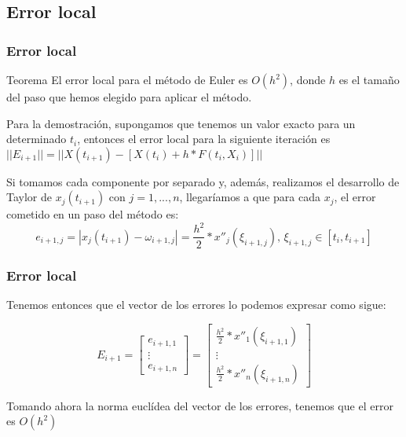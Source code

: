 \documentclass{beamer}
\begin{document}
\subsection{Error local}
\begin{frame}
	\frametitle{Error local}
	\begin{block}{Teorema}
	El error local para el método de Euler es $O(h^2)$, donde $h$ es el tamaño del paso que hemos elegido para aplicar el método.
	\end{block}
	
	Para la demostración, supongamos que tenemos un valor exacto para un determinado $t_i$, entonces el error local para la siguiente iteración es $|| E_{i+1} || = ||X(t_{i+1}) - [X(t_{i}) + h*F(t_i, X_i)] ||$
	
	Si tomamos cada componente por separado y, además, realizamos el desarrollo de Taylor de $x_j(t_{i+1})$ con $j=1,...,n$, llegaríamos a que para cada $x_j$, el error cometido en un paso del método es:
	$$ e_{i+1, j} = | x_j(t_{i+1}) - \omega_{i+1, j} | = \frac{h^2}{2}*x''_j(\xi_{i+1, j}),\, \xi_{i+1, j} \in [t_i, t_{i+1}] $$	
	
\end{frame}

\begin{frame}
	\frametitle{Error local}
	
	Tenemos entonces que el vector de los errores lo podemos expresar como sigue:
	
	\begin{equation*}
	E_{i+1}=\begin{bmatrix}
	e_{i+1, 1} \\
	\vdots \\
	e_{i+1, n}
	\end{bmatrix}=\begin{bmatrix}
	\frac{h^2}{2}*x''_1(\xi_{i+1, 1}) \\
	\vdots \\
	\frac{h^2}{2}*x''_n(\xi_{i+1, n})
	\end{bmatrix}
	\end{equation*}
	
	Tomando ahora la norma euclídea del vector de los errores, tenemos que el error es $O(h^2)$
\end{frame}
\end{document}
